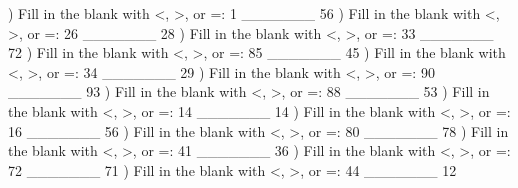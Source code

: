 \documentclass{article}%
\begin{document}
) Fill in the blank with <, >, or =: 1 \_\_\_\_\_\_\_ 56%
\newline%
\newline%
) Fill in the blank with <, >, or =: 26 \_\_\_\_\_\_\_ 28%
\newline%
\newline%
) Fill in the blank with <, >, or =: 33 \_\_\_\_\_\_\_ 72%
\newline%
\newline%
) Fill in the blank with <, >, or =: 85 \_\_\_\_\_\_\_ 45%
\newline%
\newline%
) Fill in the blank with <, >, or =: 34 \_\_\_\_\_\_\_ 29%
\newline%
\newline%
) Fill in the blank with <, >, or =: 90 \_\_\_\_\_\_\_ 93%
\newline%
\newline%
) Fill in the blank with <, >, or =: 88 \_\_\_\_\_\_\_ 53%
\newline%
\newline%
) Fill in the blank with <, >, or =: 14 \_\_\_\_\_\_\_ 14%
\newline%
\newline%
) Fill in the blank with <, >, or =: 16 \_\_\_\_\_\_\_ 56%
\newline%
\newline%
) Fill in the blank with <, >, or =: 80 \_\_\_\_\_\_\_ 78%
\newline%
\newline%
) Fill in the blank with <, >, or =: 41 \_\_\_\_\_\_\_ 36%
\newline%
\newline%
) Fill in the blank with <, >, or =: 72 \_\_\_\_\_\_\_ 71%
\newline%
\newline%
) Fill in the blank with <, >, or =: 44 \_\_\_\_\_\_\_ 12%
\end{document}
